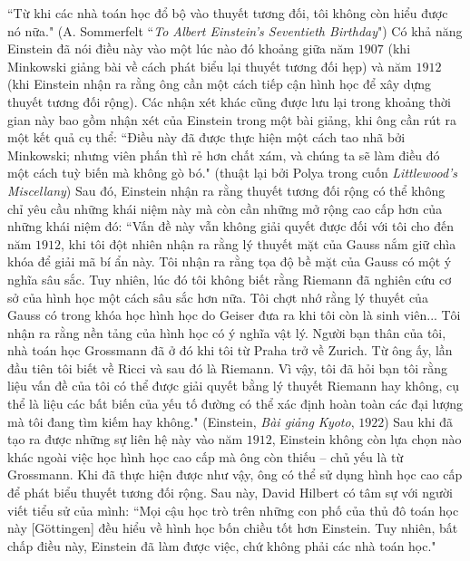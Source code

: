 \begin{multicols}{2}
	\vskip 0.1cm
	``Từ khi các nhà toán học đổ bộ vào thuyết tương đối, tôi không còn hiểu được nó nữa."
	\vskip 0.1cm
	\hfill (A. Sommerfelt 
	\vskip 0.01cm
	\hfill``\textit{To Albert Einstein's Seventieth Birthday}")
	\vskip 0.1cm
	Có khả năng Einstein đã nói điều này vào một lúc nào đó khoảng giữa năm $1907$ (khi Minkowski giảng bài về cách phát biểu lại thuyết tương đối hẹp) và năm $1912$ (khi Einstein nhận ra rằng ông cần một cách tiếp cận hình học để xây dựng thuyết tương đối rộng).
	\vskip 0.1cm
	Các nhận xét khác cũng được lưu lại trong khoảng thời gian này bao gồm nhận xét của Einstein trong một bài giảng, khi ông cần rút ra một kết quả cụ thể:
	\vskip 0.1cm
	``Điều này đã được thực hiện một cách tao nhã bởi Minkowski; nhưng viên phấn thì rẻ hơn chất xám, và chúng ta sẽ làm điều đó một cách tuỳ biến mà không gò bó."
	\vskip 0.1cm
	\hfill(thuật lại bởi Polya trong cuốn
	\vskip 0.01cm
	\hfill \textit{Littlewood's Miscellany})
	\vskip 0.1cm
	Sau đó, Einstein nhận ra rằng thuyết tương đối rộng có thể không chỉ yêu cầu những khái niệm này mà còn cần những mở rộng cao cấp hơn của những khái niệm đó:
	\vskip 0.1cm
	``Vấn đề này vẫn không giải quyết được đối với tôi cho đến năm $1912$, khi tôi đột nhiên nhận ra rằng lý thuyết mặt của Gauss nắm giữ chìa khóa để giải mã bí ẩn này. Tôi nhận ra rằng tọa độ bề mặt của Gauss có một ý nghĩa sâu sắc. Tuy nhiên, lúc đó tôi không biết rằng Riemann đã nghiên cứu cơ sở của hình học một cách sâu sắc hơn nữa. Tôi chợt nhớ rằng lý thuyết của Gauss có trong khóa học hình học do Geiser đưa ra khi tôi còn là sinh viên...
	\vskip 0.1cm
	Tôi nhận ra rằng nền tảng của hình học có ý nghĩa vật lý. Người bạn thân của tôi, nhà toán học Grossmann đã ở đó khi tôi từ Praha trở về Zurich. Từ ông ấy, lần đầu tiên tôi biết về Ricci và sau đó là Riemann. Vì vậy, tôi đã hỏi bạn tôi rằng liệu vấn đề của tôi có thể được giải quyết bằng lý thuyết Riemann hay không, cụ thể là liệu các bất biến của yếu tố đường có thể xác định hoàn toàn các đại lượng mà tôi đang tìm kiếm hay không."
	\vskip 0.1cm
	\hfill (Einstein, \textit{Bài giảng Kyoto}, $1922$)
	\vskip 0.1cm
	Sau khi đã tạo ra được những sự liên hệ này vào năm $1912$, Einstein không còn lựa chọn nào khác ngoài việc học hình học cao cấp mà ông còn thiếu -- chủ yếu là từ Grossmann. Khi  đã  thực hiện được như vậy, ông có thể sử dụng hình học cao cấp để phát biểu thuyết tương đối rộng.
	\vskip 0.1cm
	Sau này, David Hilbert có tâm sự với người viết tiểu sử của mình:
	\vskip 0.1cm
	``Mọi cậu học trò trên những con phố của thủ đô toán học này [Göttingen] đều hiểu về hình học bốn chiều tốt hơn Einstein. Tuy nhiên, bất chấp điều này, Einstein đã làm được việc, chứ không phải các nhà toán học."

\end{multicols}
